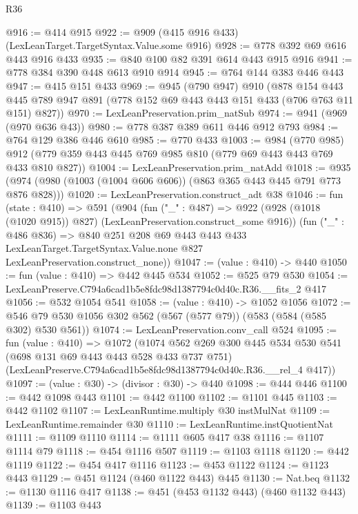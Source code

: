 \begin{lexlean}{R36}
\begin{coremodule}
@916 := @414 @915
@922 := @909 (@415 @916 @433) (LexLeanTarget.TargetSyntax.Value.some @916)
@928 := @778 @392 @69 @616 @443 @916 @433
@935 := @840 @100 @82 @391 @614 @443 @915 @916
@941 := @778 @384 @390 @448 @613 @910 @914
@945 := @764 @144 @383 @446 @443
@947 := @415 @151 @433
@969 := @945
    (@790 @947)
    @910
    (@878
      @154
      @443
      @445
      @789
      @947
      @891
      (@778 @152 @69 @443 @443 @151 @433 (@706 @763 @11 @151) @827))
@970 := LexLeanPreservation.prim_natSub
@974 := @941 (@969 (@970 @636 @43))
@980 := @778 @387 @389 @611 @446 @912 @793
@984 := @764 @129 @386 @446 @610
@985 := @770 @433
@1003 := @984
    (@770 @985)
    @912
    (@779 @359 @443 @445 @769 @985 @810 (@779 @69 @443 @443 @769 @433 @810 @827))
@1004 := LexLeanPreservation.prim_natAdd
@1018 := @935 (@974 (@980 (@1003 (@1004 @606 @606)) (@863 @365 @443 @445 @791 @773 @876 @828)))
@1020 := LexLeanPreservation.construct_adt @38
@1046 := fun (state : @410) =>
  @591
    (@904
      (fun ("_" : @487) =>
      @922 (@928 (@1018 (@1020 @915)) @827) (LexLeanPreservation.construct_some @916))
      (fun ("_" : @486 @836) =>
      @840
        @251
        @208
        @69
        @443
        @443
        @433
        LexLeanTarget.TargetSyntax.Value.none
        @827
        LexLeanPreservation.construct_none))
@1047 := (value : @410) -> @440
@1050 := fun (value : @410) => @442 @445 @534
@1052 := @525 @79 @530
@1054 := LexLeanPreserve.C794a6cad1b5e8fdc98d1387794c0d40c.R36.__fits_2 @417
@1056 := @532 @1054 @541
@1058 := (value : @410) -> @1052 @1056
@1072 := @546 @79 @530 @1056 @302 @562 (@567 (@577 @79)) (@583 (@584 (@585 @302) @530 @561))
@1074 := LexLeanPreservation.conv_call @524
@1095 := fun (value : @410) =>
  @1072
    (@1074
      @562
      @269
      @300
      @445
      @534
      @530
      @541
      (@698 @131 @69 @443 @443 @528 @433 @737 @751)
      (LexLeanPreserve.C794a6cad1b5e8fdc98d1387794c0d40c.R36.__rel_4 @417))
@1097 := (value : @30) -> (divisor : @30) -> @440
@1098 := @444 @446
@1100 := @442 @1098 @443
@1101 := @442 @1100
@1102 := @1101 @445
@1103 := @442 @1102
@1107 := LexLeanRuntime.multiply @30 instMulNat
@1109 := LexLeanRuntime.remainder @30
@1110 := LexLeanRuntime.instQuotientNat
@1111 := @1109 @1110
@1114 := @1111 @605 @417 @38
@1116 := @1107 @1114 @79
@1118 := @454 @1116 @507
@1119 := @1103 @1118
@1120 := @442 @1119
@1122 := @454 @417 @1116
@1123 := @453 @1122
@1124 := @1123 @443
@1129 := @451 @1124 (@460 @1122 @443) @445
@1130 := Nat.beq
@1132 := @1130 @1116 @417
@1138 := @451 (@453 @1132 @443) (@460 @1132 @443)
@1139 := @1103 @443

\end{coremodule}
\end{lexlean}
